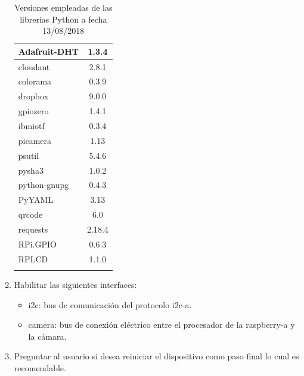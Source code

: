 \documentclass[12pt,a4paper, twoside]{report}
\begin{document}
\begin{enumerate}
\begin{longtable}{|m{4cm}|m{4cm}|}
			\multicolumn{1}{|l|}{Adafruit-DHT} & \multicolumn{1}{c|}{1.3.4} \\ \hline
			\multicolumn{1}{|l|}{cloudant} & \multicolumn{1}{c|}{2.8.1} \\ \hline
			\multicolumn{1}{|l|}{colorama} & \multicolumn{1}{c|}{0.3.9} \\ \hline
			\multicolumn{1}{|l|}{dropbox} & \multicolumn{1}{c|}{9.0.0} \\ \hline
			\multicolumn{1}{|l|}{gpiozero} & \multicolumn{1}{c|}{1.4.1} \\ \hline
			\multicolumn{1}{|l|}{ibmiotf} & \multicolumn{1}{c|}{0.3.4} \\ \hline
			\multicolumn{1}{|l|}{picamera} & \multicolumn{1}{c|}{1.13} \\ \hline
			\multicolumn{1}{|l|}{psutil} & \multicolumn{1}{c|}{5.4.6} \\ \hline
			\multicolumn{1}{|l|}{pysha3} & \multicolumn{1}{c|}{1.0.2} \\ \hline
			\multicolumn{1}{|l|}{python-gnupg} & \multicolumn{1}{c|}{0.4.3} \\ \hline
			\multicolumn{1}{|l|}{PyYAML} & \multicolumn{1}{c|}{3.13} \\ \hline
			\multicolumn{1}{|l|}{qrcode} & \multicolumn{1}{c|}{6.0} \\ \hline
			\multicolumn{1}{|l|}{requests} & \multicolumn{1}{c|}{2.18.4} \\ \hline
			\multicolumn{1}{|l|}{RPi.GPIO} & \multicolumn{1}{c|}{0.6.3} \\ \hline
			\multicolumn{1}{|l|}{RPLCD} & \multicolumn{1}{c|}{1.1.0} \\ \hline
					
			\caption{Versiones empleadas de las librerías Python a fecha 13/08/2018}
		\end{longtable}

		\item Habilitar las siguientes interfaces:
		\begin{itemize}
			\item i2c: bus de comunicación del protocolo \gls{i2c-a}.
			\item camera: bus de conexión eléctrico entre el procesador de la \gls{raspberry-a} y la cámara.		
		\end{itemize}
		
		\item Preguntar al usuario si desea reiniciar el dispositivo como paso final lo cual es recomendable.
	\end{enumerate}
		
\end{document}
